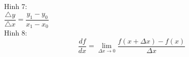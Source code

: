 \documentclass[12pt,a4paper,twoside]{article}
\begin{document}
Hinh 7: \\
$ \dfrac{\bigtriangleup y}{\bigtriangleup x} = \dfrac{y_1 - y_0}{x_1 - x_0} $\\
Hinh 8: \\
\begin{displaymath}
\dfrac{df}{dx}= \lim_{\Delta x \rightarrow 0} \dfrac{f(x+\Delta x)-f(x)}{\Delta x}
\end{displaymath}
\end{document}
